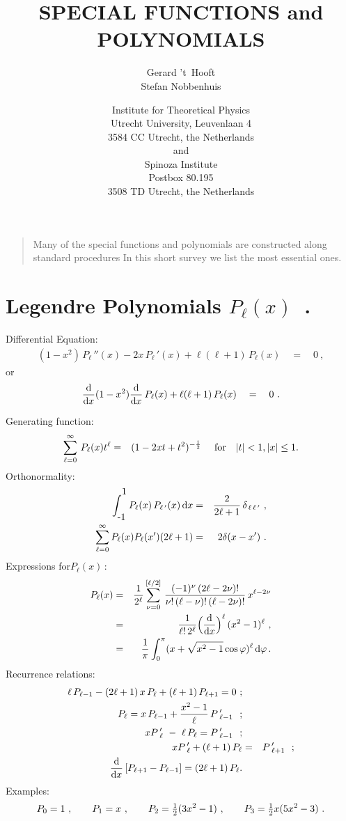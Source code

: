 \documentclass[12pt]{article}
\def\d{\delta}      \def\D{\Delta}  \def\e{\varepsilon}
\def\n{\nu}         \def\j{\psi}    \def\J{\Psi}
\def\dd{{\rm d}}  \def\bra{\langle}   \def\ket{\rangle}
\def\fract#1#2{{\textstyle{#1\over#2}}}
\def\ffract#1#2{\raise .3 em\hbox{$\scriptstyle#1$}\kern-.25em/
                \kern-.2em\lower .2 em \hbox{$\scriptstyle#2$}}
\def\fractje#1#2{{\scriptstyle{#1\over#2}}}
\def\half{\fract12} \def\quart{\fract14} \def\halff{\ffract12}
\def\halfje{\fractje12}
\def\iz{\quad = \quad}
\renewcommand{\^}[1]{\hat{#1}}
\newcommand{\be}{\begin{eqnarray}}
\newcommand{\ee}{\end{eqnarray}}
\newcommand{\nn}{\nonumber\\}
\newcommand{\nm}{\nonumber}
\newcommand{\newsec}[1]{\section{#1}\setcounter{equation}{0}}
\begin{document}
\begin{titlepage}

\title{ \Large\bf
SPECIAL FUNCTIONS and POLYNOMIALS\\}

\author{\small Gerard 't~Hooft\\
\small Stefan Nobbenhuis}
\date{\small Institute for Theoretical Physics \\
Utrecht University, Leuvenlaan 4\\ 3584 CC Utrecht, the
Netherlands\medskip \\ and
\medskip \\ Spinoza Institute \\ Postbox 80.195 \\ 3508 TD
Utrecht, the Netherlands \smallskip}

\maketitle

\begin{quotation} \noindent  Many of the special functions
and polynomials are constructed along standard procedures In this
short survey we list the most essential ones.
\end{quotation}

\vfill \flushleft{\today}

\end{titlepage}

\eject

\newsec{Legendre Polynomials \(P_\ell(x)\)\ .}
Differential Equation: \be (1-x^2)\,P_\ell\, ''(x)-2x\,P_\ell\,
'(x)+\ell (\ell+1)\,P_\ell(x)\iz 0\ ,\nm\ee or \be {\dd\over\dd
x}(1-x^2){\dd\over\dd x}\,P_\ell(x)+\ell(\ell+1)\,P_\ell(x)\iz 0\
.\ee

\bigskip\noindent Generating function:\be
\sum_{\ell=0}^\infty\,P_\ell(x)t^\ell&=&(1-2xt+t^2)^{-\halfje}\
\quad\mbox{for}\quad |t|<1, |x|\leq 1. \ee
 Orthonormality: \be\int_{\raisebox{-.3em}{-1}}^{\raisebox
{.3em}{1}} P_\ell(x)\,P_{\ell\,'}(x)\,\dd x&=&{2\over
2\ell+1}\,\d_{\,\ell\,\ell\,'}\ ,\\ \sum_{\ell=0}^\infty
P_\ell(x)P_\ell(x')(2\ell+1)&=&2\d(x-x')\ .\ee
 Expressions for\(P_\ell(x)\)\,: \be P_\ell(x)&=&{1\over
2^\ell}\sum_{\n=0}^{[\ell/2]}\,{(-1)^\n \, (2\ell-2\n)!\over
\n!\,(\ell-\n)!\,(\ell-2\n)!}\,x^{\ell -2\n}\\ &=&
{1\over\ell!\,2^\ell}\Big({\dd\over\dd x}\Big)^\ell\,(x^2-1)^\ell\
,\\&=&{1\over\pi}\int_0^\pi(x+\sqrt{x^2-1}\cos\vv)^\ell\,\dd\vv\,
. \ee
 Recurrence relations: \be \ell\,P_{\ell-1}-(2\ell+1)\,x\,
P_\ell+(\ell+1)\,P_{\ell+1} = 0\ ; \nn P_\ell =
x\,P_{\ell-1}+{x^2-1\over\ell}\,P\,'_{\ell-1}\ \ ; \nn xP\,'_\ell\
-\ \ell\,P_\ell = P\,'_{\ell-1}\ \ ;\nn
xP\,'_\ell+(\ell+1)\,P_\ell&=& P\,'_{\ell+1}\ \ ;\nn {\dd\over\dd
x}\left[P_{\ell+1}-P_{\ell-1}\right] = (2\ell+1) \, P_\ell .\ee
 Examples: \be P_0=1\ ,\qquad P_1=x\ ,\qquad
P_2=\half(3x^2-1)\ ,\qquad P_3=\half x(5x^2-3)\ .\ee \pagebreak[4]
\end{document}
